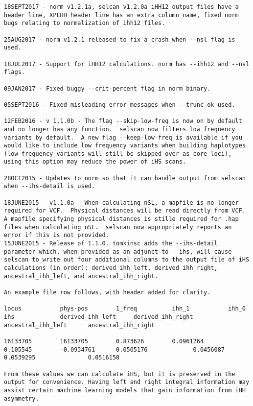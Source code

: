 \documentclass[12pt]{article}%
\begin{document}
\begin{lstlisting}
18SEPT2017 - norm v1.2.1a, selcan v1.2.0a iHH12 output files have a header line, XPEHH header line has an extra column name, fixed norm bugs relating to normalization of ihh12 files.

25AUG2017 - norm v1.2.1 released to fix a crash when --nsl flag is used.

18JUL2017 - Support for iHH12 calculations. norm has --ihh12 and --nsl flags.

09JAN2017 - Fixed buggy --crit-percent flag in norm binary.

05SEPT2016 - Fixed misleading error messages when --trunc-ok used.

12FEB2016 - v 1.1.0b - The flag --skip-low-freq is now on by default and no longer has any function.  selscan now filters low frequency variants by default.  A new flag --keep-low-freq is available if you would like to include low frequency variants when building haplotypes (low frequency variants will still be skipped over as core loci), using this option may reduce the power of iHS scans.

28OCT2015 - Updates to norm so that it can handle output from selscan when --ihs-detail is used.

18JUNE2015 - v1.1.0a - When calculating nSL, a mapfile is no longer required for VCF.  Physical distances will be read directly from VCF.  A mapfile specifying physical distances is stille required for .hap files when calculating nSL.  selscan now appropriately reports an error if this is not provided.
15JUNE2015 - Release of 1.1.0. tomkinsc adds the --ihs-detail parameter which, when provided as an adjunct to --ihs, will cause selscan to write out four additional columns to the output file of iHS calculations (in order): derived_ihh_left, derived_ihh_right, ancestral_ihh_left, and ancestral_ihh_right.

An example file row follows, with header added for clarity.

locus           phys-pos        1_freq          ihh_1           ihh_0           ihs             derived_ihh_left     derived_ihh_right    ancestral_ihh_left      ancestral_ihh_right

16133705        16133705        0.873626        0.0961264       0.105545        -0.0934761      0.0505176             0.0456087           0.0539295               0.0516158

From these values we can calculate iHS, but it is preserved in the output for convenience. Having left and right integral information may assist certain machine learning models that gain information from iHH asymmetry. 


\end{lstlisting}
\end{document}
